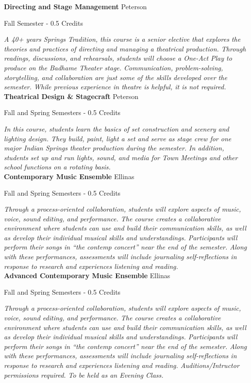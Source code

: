 \noindent\textbf{Directing and Stage Management} \hfill Peterson

\noindent Fall Semester - 0.5 Credits

\vspace{1mm}\emph{A 40+ years Springs Tradition, this course is a senior elective that explores the theories and practices of directing and managing a theatrical production. Through readings, discussions, and rehearsals, students will choose a One-Act Play to produce on the Badhame Theater stage. Communication, problem-solving, storytelling, and collaboration are just some of the skills developed over the semester. While previous experience in theatre is helpful, it is not required.}\\


\noindent\textbf{Theatrical Design \& Stagecraft} \hfill Peterson

\noindent Fall and Spring Semesters - 0.5 Credits

\vspace{1mm}\emph{In this course, students learn the basics of set construction and scenery and lighting design. They build, paint, light a set and serve as stage crew for one major Indian Springs theater production during the semester. In addition, students set up and run lights, sound, and media for Town Meetings and other school functions on a rotating basis.}\\


\noindent\textbf{Contemporary Music Ensemble} \hfill Ellinas

\noindent Fall and Spring Semesters - 0.5 Credits

\vspace{1mm}\emph{Through a process-oriented collaboration, students will explore aspects of music, voice, sound editing, and performance. The course creates a collaborative environment where students can use and build their communication skills, as well as develop their individual musical skills and understandings. Participants will perform their songs in “the contemp concert” near the end of the semester. Along with these performances, assessments will include journaling self-reflections in response to research and experiences listening and reading.}\\


\noindent\textbf{Advanced Contemporary Music Ensemble} \hfill Ellinas

\noindent Fall and Spring Semesters - 0.5 Credits

\vspace{1mm}\emph{Through a process-oriented collaboration, students will explore aspects of music, voice, sound editing, and performance. The course creates a collaborative environment where students can use and build their communication skills, as well as develop their individual musical skills and understandings. Participants will perform their songs in “the contemp concert” near the end of the semester. Along with these performances, assessments will include journaling self-reflections in response to research and experiences listening and reading.  Auditions/Intructor permissions required.  To be held as an Evening Class.}\\


